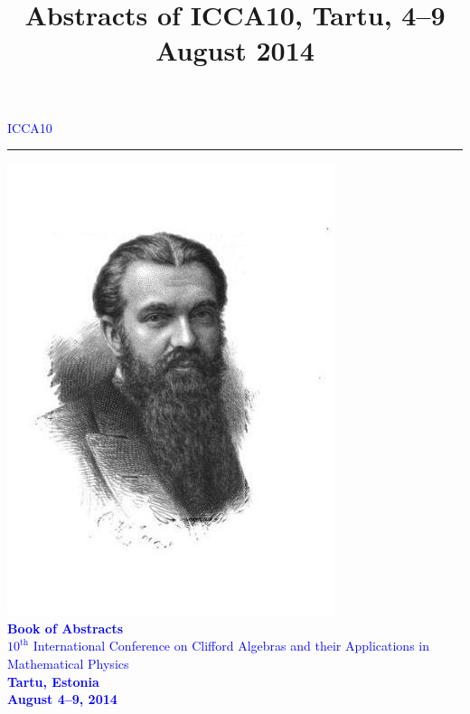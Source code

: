 \documentclass[10pt,a5paper]{book}
\begin{document}
\begin{titlepage}

   \begin{center}
      \textcolor{blue}{ \Huge{ICCA10} }
      \textcolor{blue}{ \rule[1mm]{10.1cm}{0.7pt} } 
      \includegraphics[scale=2]{clifford_large.jpg}\\      
      \textcolor{blue}{ \huge{\textbf{Book of Abstracts}} } \\
      \vspace{1cm}
      \textcolor{blue}{ \Large{$10^{\text{th}}$ International Conference on Clifford Algebras and their Applications in Mathematical Physics} } \\
      \vspace{1.4cm}
      \textcolor{blue}{ \small{\textbf{Tartu, Estonia \\ August 4–9, 2014}} }\\
   \end{center}
\end{titlepage}

\tableofcontents

\title{Abstracts of ICCA10, Tartu, 4–9 August 2014}

\newpage
\end{document}
